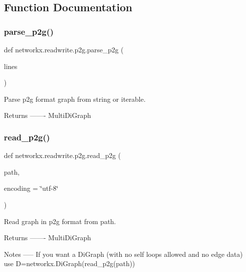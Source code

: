 \subsection{Function Documentation}
\mbox{\label{namespacenetworkx_1_1readwrite_1_1p2g_aeaae5630a70e06903b697c48467c194c}} 
\subsubsection{\texorpdfstring{parse\+\_\+p2g()}{parse\_p2g()}}
{\footnotesize\ttfamily def networkx.\+readwrite.\+p2g.\+parse\+\_\+p2g (\begin{DoxyParamCaption}\item[{}]{lines }\end{DoxyParamCaption})}

\begin{DoxyVerb}Parse p2g format graph from string or iterable.

Returns
-------
MultiDiGraph
\end{DoxyVerb}
 \mbox{\label{namespacenetworkx_1_1readwrite_1_1p2g_aa7b2cdffc6bc84649b43cd4b9945d4e9}} 
\subsubsection{\texorpdfstring{read\+\_\+p2g()}{read\_p2g()}}
{\footnotesize\ttfamily def networkx.\+readwrite.\+p2g.\+read\+\_\+p2g (\begin{DoxyParamCaption}\item[{}]{path,  }\item[{}]{encoding = {\ttfamily \char`\"{}utf-\/8\char`\"{}} }\end{DoxyParamCaption})}

\begin{DoxyVerb}Read graph in p2g format from path.

Returns
-------
MultiDiGraph

Notes
-----
If you want a DiGraph (with no self loops allowed and no edge data)
use D=networkx.DiGraph(read_p2g(path))
\end{DoxyVerb}
 \mbox{\label{namespacenetworkx_1_1readwrite_1_1p2g_adb94867390c6490add27ac393aece7a2}} 
